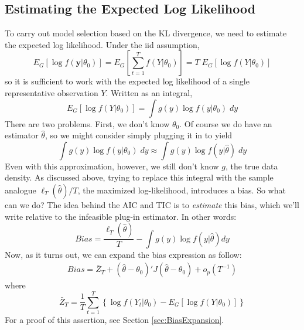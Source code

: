\subsection{Estimating the Expected Log Likelihood}
To carry out model selection based on the KL divergence, we need to estimate the expected log likelihood. Under the iid assumption,
$$E_G[\log f(\mathbf{y}|\theta_0)] = E_G\left[\sum_{t=1}^T f(Y|\theta_0) \right] = T \; E_G[\log f(Y|\theta_0)]$$
so it is sufficient to work with the expected log likelihood of a single representative observation $Y$. Written as an integral,
$$E_G[\log f(Y|\theta_0)] = \int g(y) \log f(y|\theta_0) \; dy$$
There are two problems. First, we don't know $\theta_0$. Of course we do have an estimator $\widehat{\theta}$, so we might consider simply plugging it in to yield
$$\int g(y) \log f(y|\theta_0) \; dy \approx \int g(y) \log f(y|\widehat{\theta}) \; dy$$
Even with this approximation, however, we still don't know $g$, the true data density. As discussed above, trying to replace this integral with the sample analogue $\ell_T(\widehat{\theta})/T$, the maximized log-likelihood, introduces a bias. So what can we do? The idea behind the AIC and TIC is to \emph{estimate} this bias, which we'll write relative to the infeasible plug-in estimator. In other words:
$$Bias = \frac{\ell_T(\widehat{\theta})}{T} - \int g(y) \log f(y|\widehat{\theta}) dy$$
Now, as it turns out, we can expand the bias expression as follow:
\begin{eqnarray*}
Bias = \bar{Z}_T + (\widehat{\theta} - \theta_0)' J (\widehat{\theta} - \theta_0) + o_p(T^{-1})
\end{eqnarray*}
where
$$\bar{Z}_T = \frac{1}{T} \sum_{t=1}^T\left\{ \log f(Y_t|\theta_0) - E_G[\log f(Y|\theta_0)] \right\}$$
For a proof of this assertion, see Section \ref{sec:BiasExpansion}.

